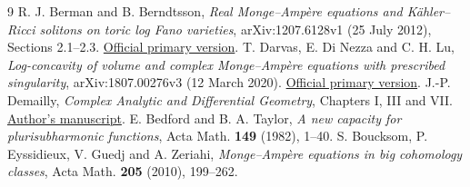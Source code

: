 \documentclass[11pt]{article}
\begin{document}
\begin{thebibliography}{9}
R. J. Berman and B. Berndtsson,
\emph{Real Monge--Amp\`ere equations and K\"ahler--Ricci solitons on toric
log Fano varieties}, arXiv:1207.6128v1 (25 July 2012), Sections 2.1--2.3.
\href{https://arxiv.org/abs/1207.6128v1}{Official primary version}.
T. Darvas, E. Di Nezza and C. H. Lu,
\emph{Log-concavity of volume and complex Monge--Amp\`ere equations with
prescribed singularity}, arXiv:1807.00276v3 (12 March 2020).
\href{https://arxiv.org/abs/1807.00276v3}{Official primary version}.
J.-P. Demailly, \emph{Complex Analytic and Differential Geometry},
Chapters I, III and VII.
\href{https://www-fourier.univ-grenoble-alpes.fr/~demailly/manuscripts/agbook.pdf}
{Author's manuscript}.
E. Bedford and B. A. Taylor,
\emph{A new capacity for plurisubharmonic functions},
Acta Math. \textbf{149} (1982), 1--40.
S. Boucksom, P. Eyssidieux, V. Guedj and A. Zeriahi,
\emph{Monge--Amp\`ere equations in big cohomology classes},
Acta Math. \textbf{205} (2010), 199--262.
\end{thebibliography}
\end{document}
